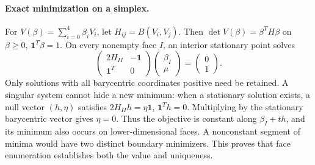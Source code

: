 \paragraph{Exact minimization on a simplex.}
For $V(\beta)=\sum_{i=0}^4\beta_iV_i$, let
$H_{ij}=B(V_i,V_j)$. Then $\det V(\beta)=\beta^TH\beta$ on
$\beta\ge0$, $\mathbf1^T\beta=1$.
On every nonempty face $I$, an interior stationary point solves
\begin{equation}\label{mi:face-system}
 \begin{pmatrix}2H_{II}&-\mathbf1\\\mathbf1^T&0\end{pmatrix}
 \begin{pmatrix}\beta_I\\\mu\end{pmatrix}
 =\begin{pmatrix}0\\1\end{pmatrix}.
\end{equation}
Only solutions with all barycentric coordinates positive need be retained.
A singular system cannot hide a new minimum: when a stationary solution
exists, a null vector $(h,\eta)$ satisfies
$2H_{II}h=\eta\mathbf1$, $\mathbf1^Th=0$.
Multiplying by the stationary barycentric vector gives $\eta=0$.
Thus the objective is constant along $\beta_I+th$, and its minimum
also occurs on lower-dimensional faces. A nonconstant segment of minima
would have two distinct boundary minimizers. This proves that face
enumeration establishes both the value and uniqueness.

